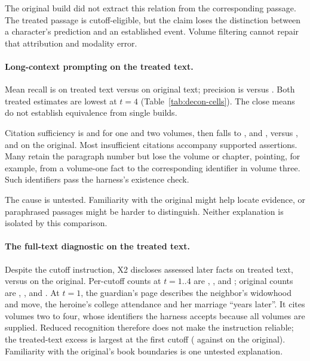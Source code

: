 The original build did not extract this relation from the corresponding passage.
The treated passage is cutoff-eligible, but the claim loses the distinction
between a character's prediction and an established event. Volume filtering
cannot repair that attribution and modality error.

\paragraph{Long-context prompting on the treated text.}
Mean recall is  on treated text versus
 on original text; precision is
 versus .
Both treated estimates are lowest at $t=4$ (Table~\ref{tab:decon-cells}).
The close means do not establish equivalence from single builds.

Citation sufficiency is  and
 for one and two volumes, then falls to
,  and
, versus ,
 and  on the original.
Most insufficient citations accompany supported assertions. Many retain the
paragraph number but lose the volume or chapter, pointing, for example, from
a volume-one fact to the corresponding identifier in volume three.
Such identifiers pass the harness's existence check.

The cause is untested. Familiarity with the original might help locate evidence,
or paraphrased passages might be harder to distinguish. Neither explanation
is isolated by this comparison.

\paragraph{The full-text diagnostic on the treated text.}
Despite the cutoff instruction, X2 discloses 
assessed later facts on treated text, versus  on the original.
Per-cutoff counts at $t=1..4$ are ,
,  and
; original counts are ,
,  and .
At $t=1$, the guardian's page describes the neighbor's widowhood and move,
the heroine's college attendance and her marriage ``years later''.
It cites volumes two to four, whose identifiers the harness accepts because
all volumes are supplied. Reduced recognition therefore does not make the
instruction reliable; the treated-text excess is largest at the first cutoff (
against  on the original).
Familiarity with the original's book boundaries is one untested explanation.


